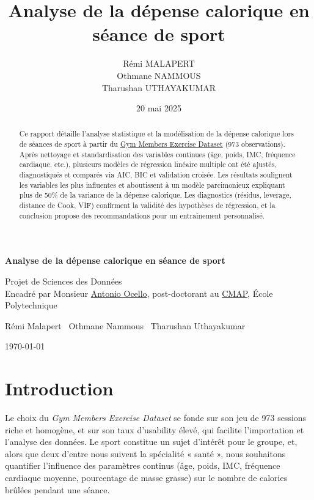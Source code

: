\documentclass[12pt,a4paper]{article}
\title{Analyse de la dépense calorique en séance de sport}
\author{
  Rémi MALAPERT \\
  Othmane NAMMOUS \\
  Tharushan UTHAYAKUMAR
}
\date{20 mai 2025}
\begin{document}
\begin{titlepage}
\centering
\vspace*{2cm}
{\LARGE\bfseries Analyse de la dépense calorique
en séance de sport\par}
\vspace{1.5cm}
{\large Projet de Sciences des Données\\
Encadré par Monsieur \href{https://antonio-ocello.github.io/}{Antonio Ocello}, post-doctorant au \href{https://cmap.ip-paris.fr/}{CMAP}, École Polytechnique\par}
\vspace{2.5cm}
{\large
Rémi Malapert \
Othmane Nammous \
Tharushan Uthayakumar\par}
\vfill
{\large \today\par}
\end{titlepage}

\begin{abstract}
Ce rapport détaille l’analyse statistique et la modélisation de la dépense calorique
lors de séances de sport à partir du \href{https://www.kaggle.com/datasets/valakhorasani/gym-members-exercise-dataset}{Gym Members Exercise Dataset} (973 observations).
Après nettoyage et standardisation des variables continues (âge, poids, IMC, fréquence cardiaque, etc.),
plusieurs modèles de régression linéaire multiple ont été ajustés, diagnostiqués et comparés
via AIC, BIC et validation croisée. Les résultats soulignent les variables les plus influentes
et aboutissent à un modèle parcimonieux expliquant plus de 50\% de la variance de la dépense
calorique. Les diagnostics (résidus, leverage, distance de Cook, VIF) confirment la validité
des hypothèses de régression, et la conclusion propose des recommandations pour un entraînement
personnalisé.
\end{abstract}

\newpage

\tableofcontents
\newpage

\section{Introduction}
Le choix du \emph{Gym Members Exercise Dataset} se fonde sur son jeu de 973 sessions riche et homogène, et sur son taux d’usability élevé, qui facilite l’importation et l’analyse des données. Le sport constitue un sujet d’intérêt pour le groupe, et, alors que deux d’entre nous suivent la spécialité « santé », nous souhaitons quantifier l’influence des paramètres continus (âge, poids, IMC, fréquence cardiaque moyenne, pourcentage de masse grasse) sur le nombre de calories brûlées pendant une séance.
\end{document}
